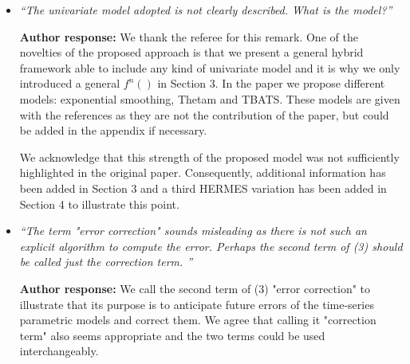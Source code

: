 \documentclass[10pt]{article} %
\begin{document}
\begin{itemize}
	
	\item {\em ``The univariate model adopted is not clearly described. What is the model?''} \medskip
	
	\textbf{Author response:} We thank the referee for this remark. One of the novelties of the proposed approach is that we present a general hybrid framework able to include any kind of univariate model and it is why we only introduced a general $f^n()$ in Section 3. In the paper we propose different models: exponential smoothing, Thetam and TBATS. These models are given with the references as they are not the contribution of the paper, but could be added in the appendix if necessary.


We acknowledge that this strength of the proposed model was not sufficiently highlighted in the original paper. Consequently, additional information has been added in Section 3 and a third HERMES variation has been added in Section 4 to illustrate this point.\\
	
	\item {\em ``The term "error correction" sounds misleading as there is not such an explicit algorithm to compute the error. Perhaps the second term of (3) should be called just the correction term. ''} \medskip
	
	\textbf{Author response:} We call the second term of (3) "error correction" to illustrate that its purpose is to anticipate future errors of the time-series parametric models and correct them. We agree that calling it "correction term" also seems appropriate and the two terms could be used interchangeably.\\
	

\end{itemize}
\end{document}
